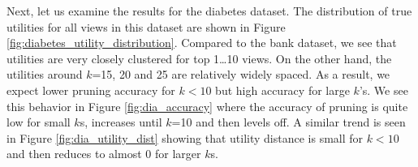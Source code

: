 


 
Next, let us examine the results for the diabetes dataset.
The distribution of true utilities for all views in this dataset are shown in
Figure \ref{fig:diabetes_utility_distribution}.
Compared to the bank dataset, we see that utilities are very closely
clustered for top 1\ldots10 views.
On the other hand, the utilities around $k$=15, 20 and 25 are relatively widely
spaced.
As a result, we expect lower pruning accuracy for $k<10$ but high accuracy for
large $k$'s.
We see this behavior in Figure \ref{fig:dia_accuracy} where the accuracy of
pruning is quite low for small $k$s, increases until $k$=10 and then levels off.
A similar trend is seen in Figure \ref{fig:dia_utility_dist} showing that
utility distance is small for $k<10$ and then reduces to almost 0 for larger
$k$s.

